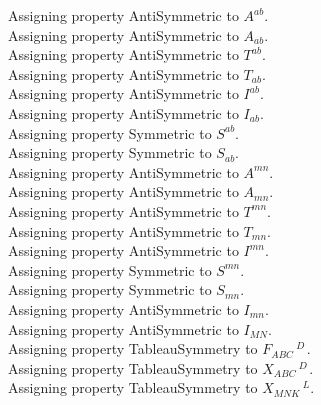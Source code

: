 \documentclass[11pt]{article}
\begin{document}
Assigning property AntiSymmetric to ${A}^{a b}$.
\\
Assigning property AntiSymmetric to ${A}_{a b}$.
\\
Assigning property AntiSymmetric to ${T}^{a b}$.
\\
Assigning property AntiSymmetric to ${T}_{a b}$.
\\
Assigning property AntiSymmetric to ${I}^{a b}$.
\\
Assigning property AntiSymmetric to ${I}_{a b}$.
\\
Assigning property Symmetric to ${S}^{a b}$.
\\
Assigning property Symmetric to ${S}_{a b}$.
\\
Assigning property AntiSymmetric to ${A}^{m n}$.
\\
Assigning property AntiSymmetric to ${A}_{m n}$.
\\
Assigning property AntiSymmetric to ${T}^{m n}$.
\\
Assigning property AntiSymmetric to ${T}_{m n}$.
\\
Assigning property AntiSymmetric to ${I}^{m n}$.
\\
Assigning property Symmetric to ${S}^{m n}$.
\\
Assigning property Symmetric to ${S}_{m n}$.
\\
Assigning property AntiSymmetric to ${I}_{m n}$.
\\
Assigning property AntiSymmetric to ${I}_{M N}$.
\\
Assigning property TableauSymmetry to ${F}_{A B C}\,^{D\, }$.
\\
Assigning property TableauSymmetry to ${X}_{A B C}\,^{D\, }$.
\\
Assigning property TableauSymmetry to ${X}_{M N K}\,^{L}$.
\\
\end{document}
